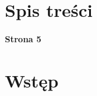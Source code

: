 \documentclass[10pt, a4paper, twoside, onecolumn]{article}
\numberwithin{equation}{section}
\begin{document}
	\section*{Spis treści}
	\begin{center}
		\textbf{Strona 5}
	\end{center}
	\tableofcontents
	\pagebreak
	
	
	\section{Wstęp}
	
\end{document}
